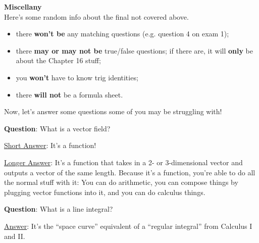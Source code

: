 \documentclass[12pt]{article}
\renewcommand{\Q}{\vspace{4.5mm}\noindent\textbf{Question}: }
\newcommand{\Ans}{\ul{Answer}: }
\newcommand{\Short}{\ul{Short Answer}: }
\newcommand{\Long}{\vspace{3mm}\ul{Longer Answer}: }
\begin{document}
\begin{adjustwidth}{0.25in}{0.25in}
		\noindent\textbf{Miscellany}\\[1.5mm]
		Here's some random info about the final not covered above.
		\begin{itemize}[topsep=1.5mm,parsep=-4.5mm,itemsep=6mm]
			\item there \textbf{won't be} any matching questions (e.g. question 4 on exam 1);
			\item there \textbf{may or may not be} true/false questions; if there are, it will \textbf{only} be about the Chapter 16 stuff;
			\item you \textbf{won't} have to know trig identities;
			\item there \textbf{will not} be a formula sheet.
%			
		\end{itemize}
%	
%		
	\end{adjustwidth}
	\setlength\parskip{3mm}
	\newpage

	Now, let's answer some questions some of you may be struggling with!
	
	\Q What is a vector field?
	
	\Short It's a function!
	
	\Long It's a function that takes in a 2- or 3-dimensional vector and outputs a vector of the same length. Because it's a function, you're able to do all the normal stuff with it: You can do arithmetic, you can compose things by plugging vector functions into it, and you can do calculus things. 
	
	\Q What is a line integral?
	
	\Ans It's the ``space curve'' equivalent of a ``regular integral'' from Calculus I and II.
	
\end{document}
